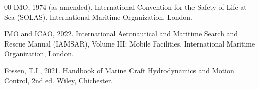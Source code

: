 \documentclass[preprint,12pt]{elsarticle}
\begin{document}
\begin{thebibliography}{00}
IMO, 1974 (as amended).
International Convention for the Safety of Life at Sea (SOLAS).
International Maritime Organization, London.

IMO and ICAO, 2022.
International Aeronautical and Maritime Search and Rescue Manual (IAMSAR), Volume III: Mobile Facilities.
International Maritime Organization, London.

Fossen, T.I., 2021.
Handbook of Marine Craft Hydrodynamics and Motion Control, 2nd ed.
Wiley, Chichester.
\end{thebibliography}
\end{document}
